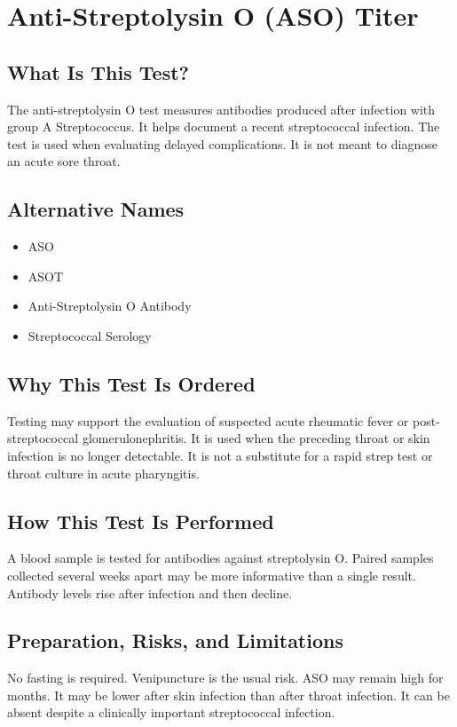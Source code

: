 \chapter{Anti-Streptolysin O (ASO) Titer}

\section*{What Is This Test?}
The anti-streptolysin O test measures antibodies produced after infection with group A Streptococcus. It helps document a recent streptococcal infection. The test is used when evaluating delayed complications. It is not meant to diagnose an acute sore throat.

\section*{Alternative Names}
\begin{itemize}
  \item ASO
  \item ASOT
  \item Anti-Streptolysin O Antibody
  \item Streptococcal Serology
\end{itemize}
\section*{Why This Test Is Ordered}
Testing may support the evaluation of suspected acute rheumatic fever or post-streptococcal glomerulonephritis. It is used when the preceding throat or skin infection is no longer detectable. It is not a substitute for a rapid strep test or throat culture in acute pharyngitis.

\section*{How This Test Is Performed}
A blood sample is tested for antibodies against streptolysin O. Paired samples collected several weeks apart may be more informative than a single result. Antibody levels rise after infection and then decline.

\section*{Preparation, Risks, and Limitations}
No fasting is required. Venipuncture is the usual risk. ASO may remain high for months. It may be lower after skin infection than after throat infection. It can be absent despite a clinically important streptococcal infection.

